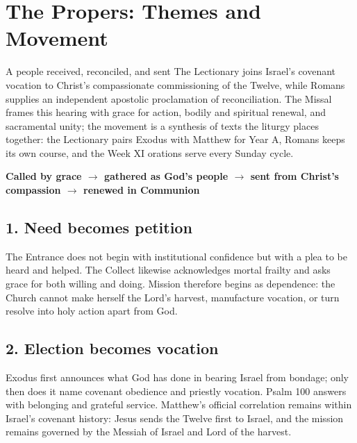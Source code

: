 \section*{The Propers: Themes and Movement}

\begin{massbox}{A people received, reconciled, and sent}
The Lectionary joins Israel's covenant vocation to Christ's compassionate commissioning of the Twelve, while Romans supplies an independent apostolic proclamation of reconciliation. The Missal frames this hearing with grace for action, bodily and spiritual renewal, and sacramental unity; the movement is a synthesis of texts the liturgy places together: the Lectionary pairs Exodus with Matthew for Year A, Romans keeps its own course, and the Week XI orations serve every Sunday cycle.
\end{massbox}

\begin{center}
\textbf{Called by grace $\longrightarrow$ gathered as God's people $\longrightarrow$ sent from Christ's compassion $\longrightarrow$ renewed in Communion}
\end{center}

\subsection*{1. Need becomes petition\enspace{}}

The Entrance does not begin with institutional confidence but with a plea to be heard and helped. The Collect likewise acknowledges mortal frailty and asks grace for both willing and doing. Mission therefore begins as dependence: the Church cannot make herself the Lord's harvest, manufacture vocation, or turn resolve into holy action apart from God.

\subsection*{2. Election becomes vocation\enspace{}}

Exodus first announces what God has done in bearing Israel from bondage; only then does it name covenant obedience and priestly vocation. Psalm 100 answers with belonging and grateful service. Matthew's official correlation remains within Israel's covenant history: Jesus sends the Twelve first to Israel, and the mission remains governed by the Messiah of Israel and Lord of the harvest.

